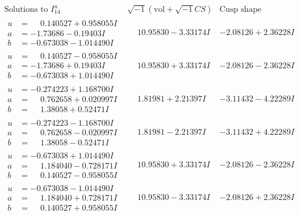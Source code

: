 \documentclass[1p]{elsarticle_modified}
\theoremstyle{definition}
\newcommand{\I}{\sqrt{-1}}
\begin{document}
$$\begin{array}{c|c|c}  
\text{Solutions to }I^u_{14}& \I (\text{vol} + \sqrt{-1}CS) & \text{Cusp shape}\\
 \hline 
\begin{aligned}
u &= \phantom{-}0.140527 + 0.958055 I \\
a &= -1.73686 - 0.19403 I \\
b &= -0.673038 - 1.014490 I\end{aligned}
 & \phantom{-}10.95830 - 3.33174 I & -2.08126 + 2.36228 I \\ \hline\begin{aligned}
u &= \phantom{-}0.140527 - 0.958055 I \\
a &= -1.73686 + 0.19403 I \\
b &= -0.673038 + 1.014490 I\end{aligned}
 & \phantom{-}10.95830 + 3.33174 I & -2.08126 - 2.36228 I \\ \hline\begin{aligned}
u &= -0.274223 + 1.168700 I \\
a &= \phantom{-}0.762658 + 0.020997 I \\
b &= \phantom{-}1.38058 + 0.52471 I\end{aligned}
 & \phantom{-}1.81981 + 2.21397 I & -3.11432 - 4.22289 I \\ \hline\begin{aligned}
u &= -0.274223 - 1.168700 I \\
a &= \phantom{-}0.762658 - 0.020997 I \\
b &= \phantom{-}1.38058 - 0.52471 I\end{aligned}
 & \phantom{-}1.81981 - 2.21397 I & -3.11432 + 4.22289 I \\ \hline\begin{aligned}
u &= -0.673038 + 1.014490 I \\
a &= \phantom{-}1.184040 - 0.728171 I \\
b &= \phantom{-}0.140527 - 0.958055 I\end{aligned}
 & \phantom{-}10.95830 + 3.33174 I & -2.08126 - 2.36228 I \\ \hline\begin{aligned}
u &= -0.673038 - 1.014490 I \\
a &= \phantom{-}1.184040 + 0.728171 I \\
b &= \phantom{-}0.140527 + 0.958055 I\end{aligned}
 & \phantom{-}10.95830 - 3.33174 I & -2.08126 + 2.36228 I \\ \hline\begin{aligned}

\end{aligned}
\end{array}$$
\end{document}

